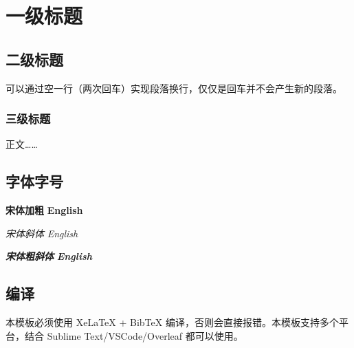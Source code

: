 %
%
%
%

\chapter{一级标题}

\section{二级标题}
可以通过空一行（两次回车）实现段落换行，仅仅是回车并不会产生新的段落\cite{yuFeiJiZongTiDuoXueKeSheJiYouHuaDeXianZhuangYuFaZhanFangXiang2008}。

\subsection{三级标题}

正文……\cite{simonyanVeryDeepConvolutional2015}

\section{字体字号}

{\songti \bfseries 宋体加粗} {\textbf{English}}

{\songti \itshape 宋体斜体} {\textit{English}}

{\songti \bfseries \itshape 宋体粗斜体} {\textbf{\textit{English}}}

\section{编译}

本模板必须使用 XeLaTeX + BibTeX 编译，否则会直接报错。本模板支持多个平台，结合 Sublime Text/VSCode/Overleaf 都可以使用。


